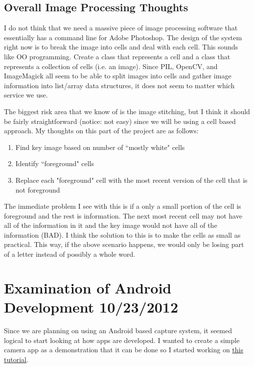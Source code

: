 \documentclass[]{article}
\begin{document}
		\subsection{Overall Image Processing Thoughts}
			I do not think that we need a massive piece of image processing software that essentially has a command line for Adobe Photoshop. The design of the system right now is to break the image into cells and deal with each cell. This sounds like OO programming. Create a class that represents a cell and a class that represents a collection of cells (i.e. an image). Since PIL, OpenCV, and ImageMagick all seem to be able to split images into cells and gather image information into list/array data structures, it does not seem to matter which service we use. 
			
			The biggest risk area that we know of is the image stitching, but I think it should be fairly straightforward (notice: not easy) since we will be using a cell based approach. My thoughts on this part of the project are as follows: 
			\begin{enumerate}
				\item Find key image based on number of ``mostly white" cells
				\item Identify ``foreground" cells
				\item Replace each "foreground" cell with the most recent version of the cell that is not foreground
			\end{enumerate}
			The immediate problem I see with this is if a only a small portion of the cell is foreground and the rest is information. The next most recent cell may not have all of the information in it and the key image would not have all of the information (BAD). I think the solution to this is to make the cells as small as practical. This way, if the above scenario happens, we would only be losing part of a letter instead of possibly a whole word. 
		
		
		
	
	
	\section{Examination of Android Development 10/23/2012}
		Since we are planning on using an Android based capture system, it seemed logical to start looking at how apps are developed. I wanted to create a simple camera app as a demonstration that it can be done so I started working on \href{http://developer.android.com/guide/topics/media/camera.html}{this tutorial}.
			
\end{document}
